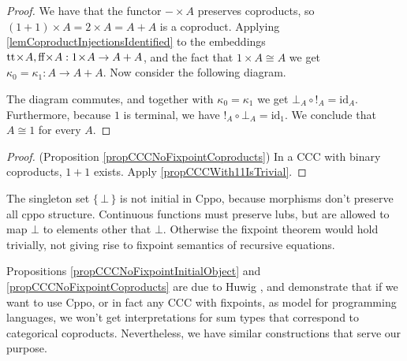 \documentclass[a4paper]{article}
\newcommand{\arr}{\rightarrow}
\newcommand{\set}[1]{\{\,#1\,\}}
\newcommand{\product}{\!\times\!}
\begin{document}
\begin{proof}
We have that the functor $- \product A$ preserves coproducts, so $(1+1)\product
A = 2 \product A = A + A$ is a coproduct. Applying
\ref{lemCoproductInjectionsIdentified} to the embeddings $\true \product A, \false
\product A : 1 \product A \arr A + A$, and the fact that $1 \product A
\cong A$ we get $\kappa_0 = \kappa_1 : A \arr A + A$. Now consider the following
diagram.

\begin{center}
\end{center}
The diagram commutes, and together with $\kappa_0 = \kappa_1$ we get $\bot_A
\circ !_A = \text{id}_A$. Furthermore, because $1$ is terminal, we have $!_A
\circ \bot_A = \text{id}_1$. We conclude that $A \cong 1$ for every $A$.
\end{proof}

\begin{proof}
(Proposition \ref{propCCCNoFixpointCoproducts}) In a CCC with binary coproducts,
$1+1$ exists. Apply \ref{propCCCWith11IsTrivial}.
\end{proof}

The singleton set $\set{\bot}$ is not initial in Cppo, because morphisms don't
preserve all cppo structure. Continuous functions must preserve lubs, but are
allowed to map $\bot$ to elements other that $\bot$. Otherwise the fixpoint
theorem would hold trivially, not giving rise to fixpoint semantics of recursive
equations.

Propositions \ref{propCCCNoFixpointInitialObject} and
\ref{propCCCNoFixpointCoproducts} are due to Huwig \cite{Huwig1990}, and
demonstrate that if we want to use Cppo, or in fact any CCC with fixpoints,  as
model for programming languages, we won't get interpretations for sum types that
correspond to categorical coproducts. Nevertheless, we have similar
constructions that serve our purpose.
\end{document}
